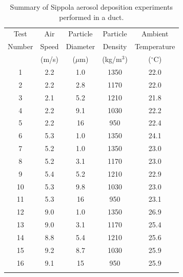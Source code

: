 \begin{table}[!ht]
\caption[Summary of Sippola aerosol deposition experiments]
{Summary of Sippola aerosol deposition experiments performed in a duct.}
\begin{tabular}{ccccc}
\hline\noalign{\smallskip}
Test      &  Air     &  Particle  &  Particle    &  Ambient      \\
Number    &  Speed   &  Diameter  &  Density     &  Temperature  \\
          &  (m/s)   &  ($\mu$m)  &  (kg/m$^3$)  &  ($^\circ$C)  \\
\noalign{\smallskip}\hline\noalign{\smallskip}
1         &  2.2     &  1.0       &  1350        &  22.0         \\
2         &  2.2     &  2.8       &  1170        &  22.0         \\
3         &  2.1     &  5.2       &  1210        &  21.8         \\
4         &  2.2     &  9.1       &  1030        &  22.2         \\
5         &  2.2     &  16        &  950         &  22.4         \\
6         &  5.3     &  1.0       &  1350        &  24.1         \\
7         &  5.2     &  1.0       &  1350        &  23.0         \\
8         &  5.2     &  3.1       &  1170        &  23.0         \\
9         &  5.4     &  5.2       &  1210        &  22.9         \\
10        &  5.3     &  9.8       &  1030        &  23.0         \\
11        &  5.3     &  16        &  950         &  23.1         \\
12        &  9.0     &  1.0       &  1350        &  26.9         \\
13        &  9.0     &  3.1       &  1170        &  25.4         \\
14        &  8.8     &  5.4       &  1210        &  25.6         \\
15        &  9.2     &  8.7       &  1030        &  25.9         \\
16        &  9.1     &  15        &  950         &  25.9         \\
\noalign{\smallskip}\hline
\end{tabular}
\label{tab:Sippola_Aerosol_Deposition_Summary}
\end{table}


